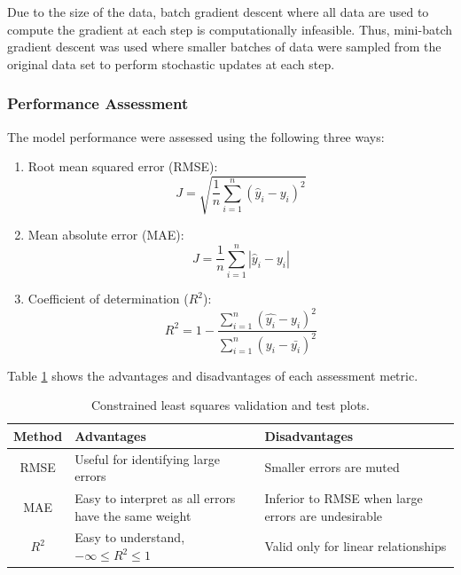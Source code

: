 Due to the size of the data, batch gradient descent where all data are used to compute the gradient at each step is computationally infeasible.  Thus, mini-batch gradient descent was used where smaller batches of data were sampled from the original data set to perform stochastic updates at each step.
\subsubsection{Performance Assessment}
The model performance were assessed using the following three ways:
\begin{enumerate}
    \item Root mean squared error (RMSE):
    \begin{equation}
        J = \sqrt{\frac{1}{n}\sum\limits^n_{i=1}(\hat{y}_i - y_i)^2}
        \label{eq:08RMSE}
    \end{equation}
    
    \item Mean absolute error (MAE):
    \begin{equation}
        J = \frac{1}{n}\sum\limits^n_{i=1}|\hat{y}_i - y_i|
        \label{eq:08MSE_Error}
    \end{equation}
    \item Coefficient of determination ($R^2$):
    \begin{equation}
        R^2 = 1 - \frac{\sum\limits^n_{i = 1}(\hat{y_i} - y_i)^2}{\sum\limits^n_{i = 1}(y_i - \bar{y_i})^2}
    \end{equation}
\end{enumerate}
Table \ref{tab:08performanceassessment} shows the advantages and disadvantages of each assessment metric.
\begin{table}[h]
    \centering
    {
    \begin{tabular}{ c | p{7cm} | p{7cm}}
         Method             & Advantages        &  Disadvantages \\
        \hline
        RMSE                &  Useful for identifying large errors                            &  Smaller errors are muted        \\
        
        MAE                 &  Easy to interpret as all errors have the same weight           &  Inferior to RMSE when large errors are undesirable \\
        
        $R^2$               &  Easy to understand, $-\infty \leq R^2 \leq 1$                                         &  Valid only for linear relationships       \\             
    \end{tabular}}
    \caption{Constrained least squares validation and test plots.}
    \label{tab:08performanceassessment}
\end{table}

